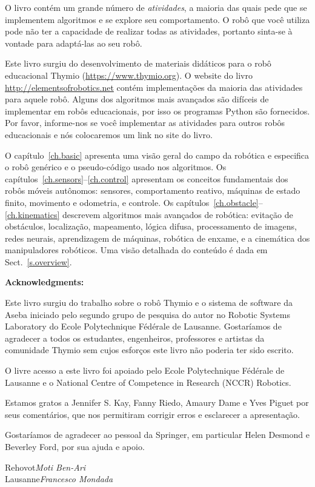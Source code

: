 O livro contém um grande número de \emph{atividades}, a maioria das quais pede que se implementem algoritmos e se explore seu comportamento. O robô que você utiliza pode não ter a capacidade de realizar todas as atividades, portanto sinta-se à vontade para adaptá-las ao seu robô.

Este livro surgiu do desenvolvimento de materiais didáticos para o robô educacional Thymio (\url{https://www.thymio.org}). O website do livro \url{http://elementsofrobotics.net} contém implementações da maioria das atividades para aquele robô. Alguns dos algoritmos mais avançados são difíceis de implementar em robôs educacionais, por isso os programas Python são fornecidos. Por favor, informe-nos se você implementar as atividades para outros robôs educacionais e nós colocaremos um link no site do livro.

O capítulo~\ref{ch.basic} apresenta uma visão geral do campo da robótica e especifica o robô genérico e o pseudo-código usado nos algoritmos. Os capítulos~\ref{ch.sensors}--\ref{ch.control} apresentam os conceitos fundamentais dos robôs móveis autônomos: sensores, comportamento reativo, máquinas de estado finito, movimento e odometria, e controle. Os capítulos~\ref{ch.obstacle}--\ref{ch.kinematics} descrevem algoritmos mais avançados de robótica: evitação de obstáculos, localização, mapeamento, lógica difusa, processamento de imagens, redes neurais, aprendizagem de máquinas, robótica de enxame, e a cinemática dos manipuladores robóticos. Uma visão detalhada do conteúdo é dada em Sect.~\ref{s.overview}.

\bigskip

\noindent\textbf{Acknowledgments:}

Este livro surgiu do trabalho sobre o robô Thymio e o sistema de software da Aseba iniciado pelo segundo grupo de pesquisa do autor no Robotic Systems Laboratory do Ecole Polytechnique F\'{e}d\'{e}rale de Lausanne. Gostaríamos de agradecer a todos os estudantes, engenheiros, professores e artistas da comunidade Thymio sem cujos esforços este livro não poderia ter sido escrito.

O livre acesso a este livro foi apoiado pelo Ecole Polytechnique F\'{e}d\'{e}rale de Lausanne e o National Centre of Competence in Research (NCCR) Robotics.

Estamos gratos a Jennifer S. Kay, Fanny Riedo, Amaury Dame e Yves Piguet por seus comentários, que nos permitiram corrigir erros e esclarecer a apresentação.

Gostaríamos de agradecer ao pessoal da Springer, em particular Helen Desmond e Beverley Ford, por sua ajuda e apoio.

\bigskip

\begin{flushright}\noindent
Rehovot\hfill {\it Moti Ben-Ari}\\
Lausanne\hfill {\it Francesco Mondada}\\
\end{flushright}
 
\tableofcontents
